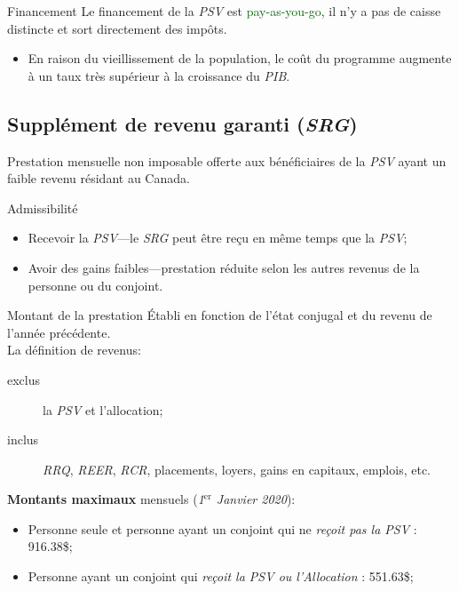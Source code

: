 \documentclass[10pt, french]{article}
\begin{document}
\begin{multicols*}{3}
\begin{conceptgen}{Financement}
Le financement de la \textit{PSV} est \textcolor{darkgreen}{pay-as-you-go}, il n'y a pas de caisse distincte et sort directement des impôts.
\begin{itemize}[leftmargin = *]
	\item En raison du vieillissement de la population, le coût du programme augmente à un taux très supérieur à la croissance du \textit{PIB}.
\end{itemize}
\end{conceptgen}

\columnbreak

\subsection{Supplément de revenu garanti (\textit{SRG})}
\label{sec:SRG}
\begin{definitionNOHFILL}[Définition]
Prestation mensuelle non imposable offerte aux bénéficiaires de la \textit{PSV} ayant un faible revenu résidant au Canada. 
\end{definitionNOHFILL}

\begin{conceptgen}{Admissibilité}
\begin{itemize}[leftmargin = *]
	\item	Recevoir la \textit{PSV}---le \textit{SRG} peut être reçu en même temps que la \textit{PSV};
	\item	Avoir des gains faibles---prestation réduite selon les autres revenus de la personne ou du conjoint.
\end{itemize}
\end{conceptgen}

\begin{conceptgen}{Montant de la prestation}
Établi en fonction de l'état conjugal et du revenu de l'année précédente.\\

La définition de revenus:
\begin{description}
	\item[exclus]	la \textit{PSV} et l'allocation;
	\item[inclus]	\textit{RRQ}, \textit{REER}, \textit{RCR}, placements, loyers, gains en capitaux, emplois, etc.
\end{description}

\textbf{Montants maximaux} mensuels (\textit{1$^{\text{er}}$ Janvier 2020}):
\begin{itemize}[leftmargin = *]
	\item	Personne seule et personne ayant un conjoint qui ne \textit{reçoit pas la PSV} : 916.38\$;
	\item	Personne ayant un conjoint qui \textit{reçoit la PSV ou l'Allocation} : 551.63\$;
\end{itemize}


\end{conceptgen}
\end{multicols*}
\end{document}
